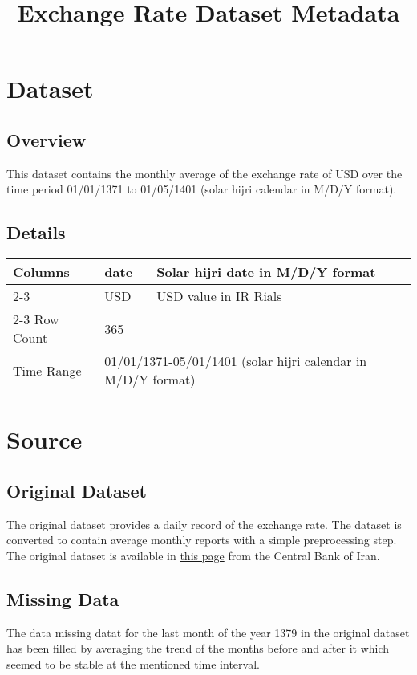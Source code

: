 \documentclass[fleqn]{report}
\begin{document}
\pagestyle{fancy}
\fancyhf{}

\title{Exchange Rate Dataset Metadata}
\date{}
\maketitle

\newpage

\chapter*{Dataset}
\section*{Overview}
This dataset contains the monthly average of the exchange rate of USD over the time period 01/01/1371 to 01/05/1401 (solar hijri calendar in M/D/Y format).
\section*{Details}
\begin{center}
    \begin{tabular}{|l|ll|}
        \hline
        \multirow{3}{*}{Columns} & \multicolumn{1}{l|}{date}       & Solar hijri date in M/D/Y format                          \\ \cline{2-3} 
                                 & \multicolumn{1}{l|}{USD}        & USD value in IR Rials                        \\ \cline{2-3} \hline
        Row Count                & \multicolumn{2}{l|}{365}                                                       \\ \hline
        Time Range               & \multicolumn{2}{l|}{01/01/1371-05/01/1401  (solar hijri calendar in M/D/Y format)}             \\ \hline
    \end{tabular}
\end{center}

\chapter*{Source}
\section*{Original Dataset}
The original dataset provides a daily record of the exchange rate. The dataset is converted to contain average monthly reports with a simple preprocessing step.
The original dataset is available in 
\href{https://www.cbi.ir/exratesadv/exratesadv_en.aspx}{this page}
 from the Central Bank of Iran.

\section*{Missing Data}
The data missing datat for the last month of the year 1379 in the original dataset has been filled by averaging the trend of the months before and after it which seemed to be stable at the mentioned time interval.
 
\end{document}
